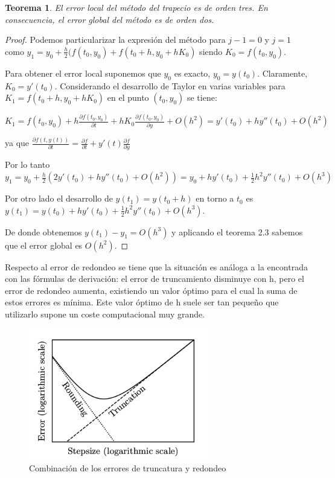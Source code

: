 \documentclass{article}
\theoremstyle{theorem-style}  %
\newtheorem{theorem}{Teorema}[section]  %
\theoremstyle{definition-style}
\theoremstyle{example-style}
\begin{document}
\begin{theorem}
El error local del método del trapecio es de orden tres. En consecuencia, el error global del método es de orden dos. 
\end{theorem}
\begin{proof}
Podemos particularizar la expresión del método para $j-1 = 0$ y $j=1$ como 
$y_1=y_0+\frac{h}{2}(f(t_0,y_0)+f(t_0+h,y_0+h K_0)$ siendo $K_0=f(t_0,y_0)$. 

Para obtener el error local suponemos que $y_0$ es exacto, $y_0=y(t_0)$. Claramente, $K_0 = y'(t_0)$. Considerando el desarrollo de Taylor en varias variables para $K_1=f(t_0+h,y_0+h K_0)$ en el punto $(t_0,y_0)$ se tiene:

$K_1 = f(t_0,y_0) + h \frac{\partial f(t_0,y_0)}{\partial t}+h K_0\frac{\partial f(t_0,y_0)}{\partial y}+O(h^{2})=y'(t_0)+hy''(t_0)+O(h^{2})$ 

ya que $\frac{\partial f(t,y(t))}{\partial t} = \frac{\partial f}{\partial t} + y'(t)\frac{\partial f}{\partial y}$

Por lo tanto $y_1=y_0+\frac{h}{2}(2y'(t_0)+hy''(t_0)+O(h^2))=y_0+hy'(t_0)+\frac{1}{2}h^{2}y''(t_0)+O(h^3)$

Por otro lado el desarrollo de $y(t_1)=y(t_0 + h)$ en torno a $t_0$ es 
$y(t_1)=y(t_0)+hy'(t_0)+\frac{1}{2}h^{2}y''(t_0)+O(h^{3})$. 

De donde obtenemos $y(t_1)-y_1=O(h^{3})$ y aplicando el teorema 2.3 sabemos que el error global es $O(h^{2})$.
\end{proof}

Respecto al error de redondeo se tiene que la situación es análoga a la encontrada con las fórmulas de derivación: el error de truncamiento disminuye con h, pero el error de redondeo aumenta, existiendo un valor óptimo para el cual la suma de estos errores es mínima. Este valor óptimo de h suele ser tan pequeño que utilizarlo supone un coste computacional muy grande. 

		\begin{figure}[H]
			\centering
			\includegraphics[width=8cm]{./Images/redondeo.png}
			\caption{Combinación de los errores de truncatura y redondeo} 
			\label{fig:redondeo}
		\end{figure}
\end{document}
